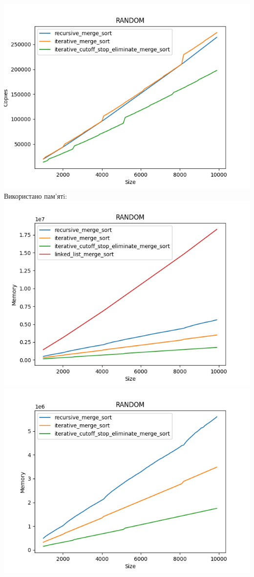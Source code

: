 \documentclass{article}
\begin{document}
            \includegraphics[scale=0.5]{random_Copies_3_sorts_90_numbers_50.png}
        \newline
        Використано пам’ятi:
        \newline
            \includegraphics[scale=0.5]{random_Memory_4_sorts_90_numbers_50.png}
            \includegraphics[scale=0.5]{random_Memory_3_sorts_90_numbers_50.png}
\end{document}
